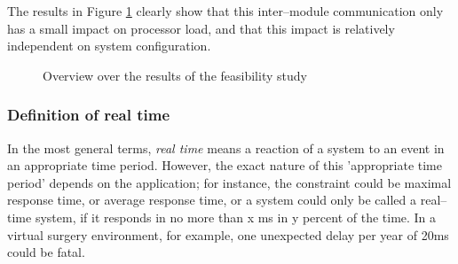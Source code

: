 The results in Figure \ref{feasibility_study} clearly show that this 
inter--module communication only has a small impact on processor load, and that 
this impact is relatively independent on system configuration.


\begin{figure}[ht]
 \centerline{}
 \caption{Overview over the results of the feasibility study}
 \label{feasibility_study}
\end{figure}


\subsubsection{Definition of real time}

In the most general terms, \textit{real time} means a reaction of a system to an 
event in an appropriate time period. However, the exact nature of this 
'appropriate time period' depends on the application; for instance, the 
constraint could be maximal response time, or average response time, or a system 
could only be called a real--time system, if it responds in no more than x ms in 
y percent of the time. In a virtual surgery environment, for example, one 
unexpected delay per year of 20ms could be fatal.

